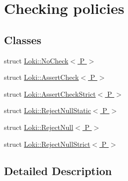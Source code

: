 \hypertarget{group__SmartPointerCheckingGroup}{}\section{Checking policies}
\label{group__SmartPointerCheckingGroup}
\subsection*{Classes}
\begin{DoxyCompactItemize}
\item 
struct \hyperlink{structLoki_1_1NoCheck}{Loki\+::\+No\+Check$<$ P $>$}
\item 
struct \hyperlink{structLoki_1_1AssertCheck}{Loki\+::\+Assert\+Check$<$ P $>$}
\item 
struct \hyperlink{structLoki_1_1AssertCheckStrict}{Loki\+::\+Assert\+Check\+Strict$<$ P $>$}
\item 
struct \hyperlink{structLoki_1_1RejectNullStatic}{Loki\+::\+Reject\+Null\+Static$<$ P $>$}
\item 
struct \hyperlink{structLoki_1_1RejectNull}{Loki\+::\+Reject\+Null$<$ P $>$}
\item 
struct \hyperlink{structLoki_1_1RejectNullStrict}{Loki\+::\+Reject\+Null\+Strict$<$ P $>$}
\end{DoxyCompactItemize}


\subsection{Detailed Description}
